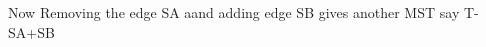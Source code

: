\documentclass[preview]{standalone}
\begin{document}
\begin{center}
Now Removing the edge SA aand adding edge SB gives another MST say T-SA+SB
\end{center}
\end{document}
